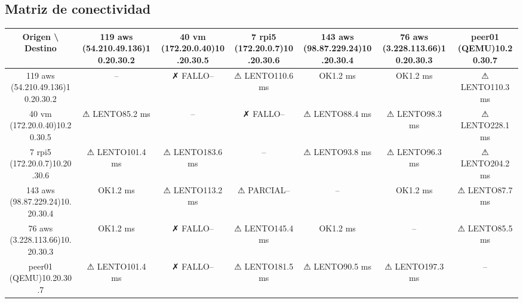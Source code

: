 \documentclass[11pt,a4paper]{article}
\begin{document}
\subsection{Matriz de conectividad}
\begin{longtable}{|c|c|c|c|c|c|c|}
\hline
Origen \textbackslash{} Destino & 119 aws (54.210.49.136)10.20.30.2 & 40 vm (172.20.0.40)10.20.30.5 & 7 rpi5 (172.20.0.7)10.20.30.6 & 143 aws (98.87.229.24)10.20.30.4 & 76 aws (3.228.113.66)10.20.30.3 & peer01 (QEMU)10.20.30.7 \\ \hline
119 aws (54.210.49.136)10.20.30.2 & -- & ✗ FALLO-- & ⚠ LENTO110.6 ms & OK1.2 ms & OK1.2 ms & ⚠ LENTO110.3 ms \\ \hline
40 vm (172.20.0.40)10.20.30.5 & ⚠ LENTO85.2 ms & -- & ✗ FALLO-- & ⚠ LENTO88.4 ms & ⚠ LENTO98.3 ms & ⚠ LENTO228.1 ms \\ \hline
7 rpi5 (172.20.0.7)10.20.30.6 & ⚠ LENTO101.4 ms & ⚠ LENTO183.6 ms & -- & ⚠ LENTO93.8 ms & ⚠ LENTO96.3 ms & ⚠ LENTO204.2 ms \\ \hline
143 aws (98.87.229.24)10.20.30.4 & OK1.2 ms & ⚠ LENTO113.2 ms & ⚠ PARCIAL-- & -- & OK1.2 ms & ⚠ LENTO87.7 ms \\ \hline
76 aws (3.228.113.66)10.20.30.3 & OK1.2 ms & ✗ FALLO-- & ⚠ LENTO145.4 ms & OK1.2 ms & -- & ⚠ LENTO85.5 ms \\ \hline
peer01 (QEMU)10.20.30.7 & ⚠ LENTO101.4 ms & ✗ FALLO-- & ⚠ LENTO181.5 ms & ⚠ LENTO90.5 ms & ⚠ LENTO197.3 ms & -- \\ \hline
\end{longtable}
\end{document}
